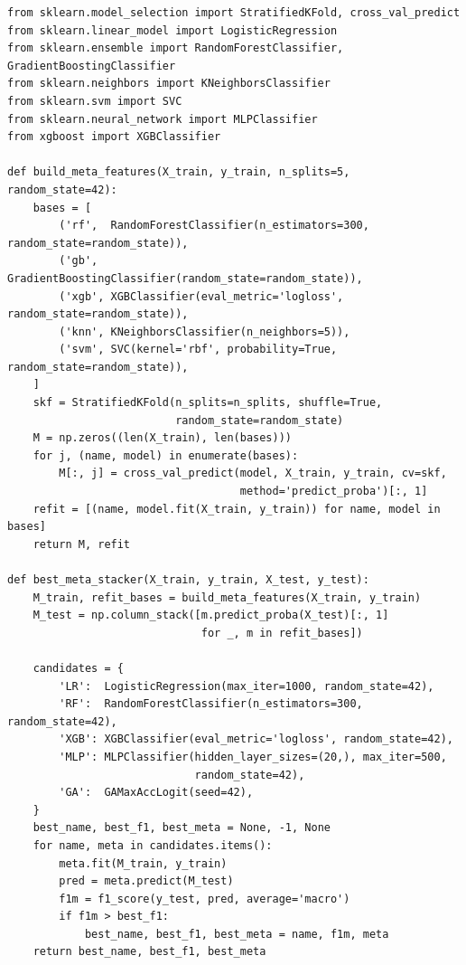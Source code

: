 \begin{lstlisting}
from sklearn.model_selection import StratifiedKFold, cross_val_predict
from sklearn.linear_model import LogisticRegression
from sklearn.ensemble import RandomForestClassifier, GradientBoostingClassifier
from sklearn.neighbors import KNeighborsClassifier
from sklearn.svm import SVC
from sklearn.neural_network import MLPClassifier
from xgboost import XGBClassifier

def build_meta_features(X_train, y_train, n_splits=5, random_state=42):
    bases = [
        ('rf',  RandomForestClassifier(n_estimators=300, random_state=random_state)),
        ('gb',  GradientBoostingClassifier(random_state=random_state)),
        ('xgb', XGBClassifier(eval_metric='logloss', random_state=random_state)),
        ('knn', KNeighborsClassifier(n_neighbors=5)),
        ('svm', SVC(kernel='rbf', probability=True, random_state=random_state)),
    ]
    skf = StratifiedKFold(n_splits=n_splits, shuffle=True,
                          random_state=random_state)
    M = np.zeros((len(X_train), len(bases)))
    for j, (name, model) in enumerate(bases):
        M[:, j] = cross_val_predict(model, X_train, y_train, cv=skf,
                                    method='predict_proba')[:, 1]
    refit = [(name, model.fit(X_train, y_train)) for name, model in bases]
    return M, refit

def best_meta_stacker(X_train, y_train, X_test, y_test):
    M_train, refit_bases = build_meta_features(X_train, y_train)
    M_test = np.column_stack([m.predict_proba(X_test)[:, 1]
                              for _, m in refit_bases])

    candidates = {
        'LR':  LogisticRegression(max_iter=1000, random_state=42),
        'RF':  RandomForestClassifier(n_estimators=300, random_state=42),
        'XGB': XGBClassifier(eval_metric='logloss', random_state=42),
        'MLP': MLPClassifier(hidden_layer_sizes=(20,), max_iter=500,
                             random_state=42),
        'GA':  GAMaxAccLogit(seed=42),
    }
    best_name, best_f1, best_meta = None, -1, None
    for name, meta in candidates.items():
        meta.fit(M_train, y_train)
        pred = meta.predict(M_test)
        f1m = f1_score(y_test, pred, average='macro')
        if f1m > best_f1:
            best_name, best_f1, best_meta = name, f1m, meta
    return best_name, best_f1, best_meta
\end{lstlisting}
